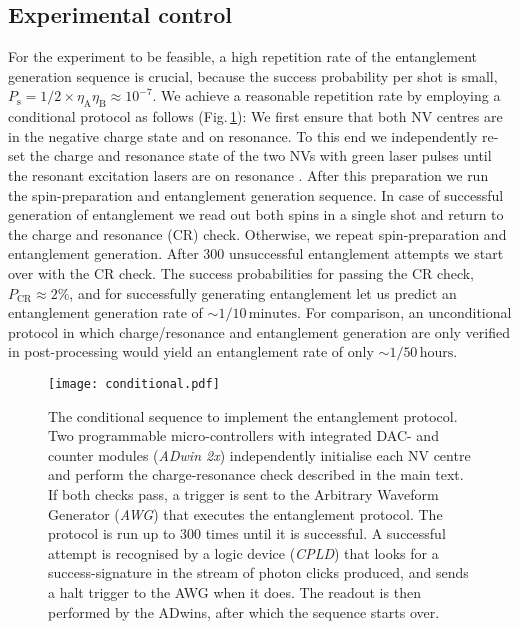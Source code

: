 \subsection{Experimental control}
For the experiment to be feasible, a high repetition rate of the entanglement generation sequence is crucial, because the success probability per shot is small, $P_\mathrm s = 1/2 \times \eta_\mathrm A\eta_\mathrm B \approx 10^{-7}$. We achieve a reasonable repetition rate by employing a conditional protocol as follows (Fig.\,\ref{fig:conditional_measurement}): We first ensure that both NV centres are in the negative charge state and on resonance. To this end we independently re-set the charge and resonance state of the two NVs with green laser pulses until the resonant excitation lasers are on resonance \cite{Robledo:2011fs,Pfaff:2012ue}. After this preparation we run the spin-preparation and entanglement generation sequence. In case of successful generation of entanglement we read out both spins in a single shot and return to the charge and resonance (CR) check. Otherwise, we repeat spin-preparation and entanglement generation. After 300 unsuccessful entanglement attempts we start over with the CR check. The success probabilities for passing the CR check, $P_\mathrm{CR} \approx 2\%$, and for successfully generating entanglement let us predict an entanglement generation rate of $\sim 1/10\,\mathrm{minutes}$. For comparison, an unconditional protocol in which charge/resonance and entanglement generation are only verified in post-processing would yield an entanglement rate of only $\sim 1/50\,\mathrm{hours}$.

\begin{figure}[h]
\centering
\texttt{[image: conditional.pdf]}
\caption{The conditional sequence to implement the entanglement protocol. Two programmable micro-controllers with integrated DAC- and counter modules ({\em ADwin 2x})  independently initialise each NV centre and perform the charge-resonance check described in the main text. If both checks pass, a trigger is sent to the Arbitrary Waveform Generator ({\em AWG}) that executes the entanglement protocol. The protocol is run up to 300 times until it is successful. A successful attempt is recognised by a logic device ({\em CPLD}) that looks for a success-signature in the stream of photon clicks produced, and sends a halt trigger to the AWG when it does. The readout is then performed by the ADwins, after which the sequence starts over.}
\label{fig:conditional_measurement}
\end{figure}

